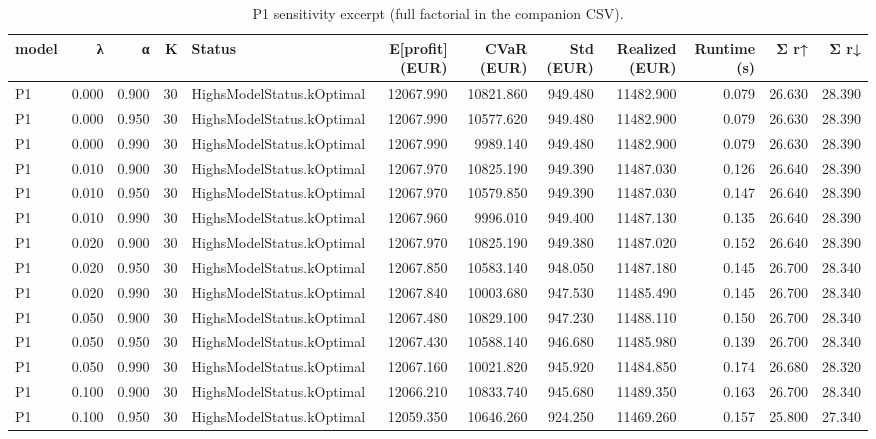 \begin{table}
\caption{P1 sensitivity excerpt (full factorial in the companion CSV).}
\label{tab:sens}
\begin{tabular}{lrrrlrrrrrrr}
\toprule
model & λ & α & K & Status & E[profit] (EUR) & CVaR (EUR) & Std (EUR) & Realized (EUR) & Runtime (s) & Σ r↑ & Σ r↓ \\
\midrule
P1 & 0.000 & 0.900 & 30 & HighsModelStatus.kOptimal & 12067.990 & 10821.860 & 949.480 & 11482.900 & 0.079 & 26.630 & 28.390 \\
P1 & 0.000 & 0.950 & 30 & HighsModelStatus.kOptimal & 12067.990 & 10577.620 & 949.480 & 11482.900 & 0.079 & 26.630 & 28.390 \\
P1 & 0.000 & 0.990 & 30 & HighsModelStatus.kOptimal & 12067.990 & 9989.140 & 949.480 & 11482.900 & 0.079 & 26.630 & 28.390 \\
P1 & 0.010 & 0.900 & 30 & HighsModelStatus.kOptimal & 12067.970 & 10825.190 & 949.390 & 11487.030 & 0.126 & 26.640 & 28.390 \\
P1 & 0.010 & 0.950 & 30 & HighsModelStatus.kOptimal & 12067.970 & 10579.850 & 949.390 & 11487.030 & 0.147 & 26.640 & 28.390 \\
P1 & 0.010 & 0.990 & 30 & HighsModelStatus.kOptimal & 12067.960 & 9996.010 & 949.400 & 11487.130 & 0.135 & 26.640 & 28.390 \\
P1 & 0.020 & 0.900 & 30 & HighsModelStatus.kOptimal & 12067.970 & 10825.190 & 949.380 & 11487.020 & 0.152 & 26.640 & 28.390 \\
P1 & 0.020 & 0.950 & 30 & HighsModelStatus.kOptimal & 12067.850 & 10583.140 & 948.050 & 11487.180 & 0.145 & 26.700 & 28.340 \\
P1 & 0.020 & 0.990 & 30 & HighsModelStatus.kOptimal & 12067.840 & 10003.680 & 947.530 & 11485.490 & 0.145 & 26.700 & 28.340 \\
P1 & 0.050 & 0.900 & 30 & HighsModelStatus.kOptimal & 12067.480 & 10829.100 & 947.230 & 11488.110 & 0.150 & 26.700 & 28.340 \\
P1 & 0.050 & 0.950 & 30 & HighsModelStatus.kOptimal & 12067.430 & 10588.140 & 946.680 & 11485.980 & 0.139 & 26.700 & 28.340 \\
P1 & 0.050 & 0.990 & 30 & HighsModelStatus.kOptimal & 12067.160 & 10021.820 & 945.920 & 11484.850 & 0.174 & 26.680 & 28.320 \\
P1 & 0.100 & 0.900 & 30 & HighsModelStatus.kOptimal & 12066.210 & 10833.740 & 945.680 & 11489.350 & 0.163 & 26.700 & 28.340 \\
P1 & 0.100 & 0.950 & 30 & HighsModelStatus.kOptimal & 12059.350 & 10646.260 & 924.250 & 11469.260 & 0.157 & 25.800 & 27.340 \\

\end{tabular}
\end{table}
